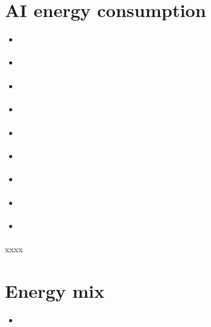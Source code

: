 \documentclass[11pt]{article}
\begin{document}
\section*{AI energy consumption}

\begin{itemize}
    \item \cite{castano2023exploring}
    \item \cite{devries2023growing}
    \item \cite{heguerte2023estimate}
    \item \cite{gowda2024watt}
    \item \cite{luccioni2023counting}
    \item \cite{patterson2021carbon}
    \item \cite{rodriguez2024evaluating}
    \item \cite{tomlinson2024carbon}
    \item \cite{tripp2024measuring}
\end{itemize}

xxxx

\section*{Energy mix}
\begin{itemize}
    \item \cite{krebs2018umweltbilanz}
\end{itemize}

\printbibliography
\end{document}
